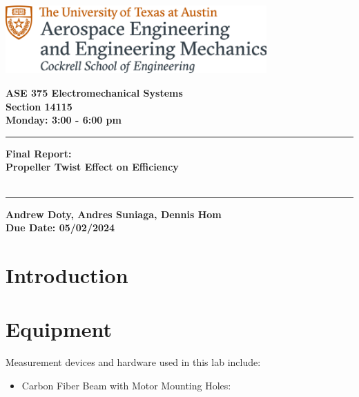 \documentclass{article}
\begin{document}
\begin{titlepage}
  \centering
  \includegraphics[width=10cm]{ase-logo-formal.png}  %
  \vspace{1cm}  %
 
  \Large \textbf{ASE 375 Electromechanical Systems}\\
  \large \textbf{Section 14115}\\
  \vspace{0.5cm}
  \textbf{Monday: 3:00 - 6:00 pm}\\
 
  \vspace{1cm}
 
  \hrule
  \vspace{0.5cm}
 
  \Huge \textbf{Final Report:\\
    Propeller Twist Effect on Efficiency}\\
  \Huge \textbf{}\\
 
  \vspace{0.5cm}
  \hrule
 
  \vspace{1cm}
 
  \normalsize \textbf{Andrew Doty, Andres Suniaga, Dennis Hom}\\
  \normalsize \textbf{Due Date: 05/02/2024}
 
\end{titlepage}
\newpage

\tableofcontents
\thispagestyle{empty}
\newpage

\section{Introduction}

\section{Equipment}
Measurement devices and hardware used in this lab include:
\begin{itemize}

\item Carbon Fiber Beam with Motor Mounting Holes: 
\vspace{1mm}

\vspace{2.5mm}

\end{itemize}
\end{document}

